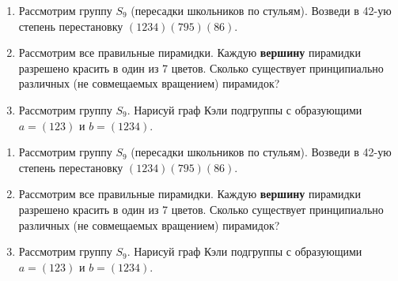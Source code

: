 \documentclass[12pt]{article} %
\begin{document}
\vspace{1cm}


\begin{enumerate}
\item Рассмотрим группу $S_{9}$ (пересадки школьников по стульям). Возведи в 42-ую степень перестановку $(1234)(795)(86)$.

\item Рассмотрим все правильные пирамидки. Каждую \textbf{вершину} пирамидки разрешено красить в один из 7 цветов. Сколько существует принципиально различных (не совмещаемых вращением) пирамидок?

\item Рассмотрим группу $S_9$. Нарисуй граф Кэли подгруппы с образующими $a=(123)$ и $b=(1234)$.

\end{enumerate}

\vspace{1cm}


\begin{enumerate}
\item Рассмотрим группу $S_{9}$ (пересадки школьников по стульям). Возведи в 42-ую степень перестановку $(1234)(795)(86)$.

\item Рассмотрим все правильные пирамидки. Каждую \textbf{вершину} пирамидки разрешено красить в один из 7 цветов. Сколько существует принципиально различных (не совмещаемых вращением) пирамидок?

\item Рассмотрим группу $S_9$. Нарисуй граф Кэли подгруппы с образующими $a=(123)$ и $b=(1234)$.

\end{enumerate}
\end{document}
